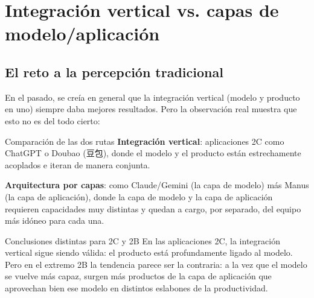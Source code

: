 \section{Integración vertical vs. capas de modelo/aplicación}

\subsection{El reto a la percepción tradicional}

En el pasado, se creía en general que la integración vertical (modelo y producto en uno) siempre daba mejores resultados. Pero la observación real muestra que esto no es del todo cierto:

\begin{knowledgebox}{Comparación de las dos rutas}
\textbf{Integración vertical}: aplicaciones 2C como ChatGPT o Doubao (豆包), donde el modelo y el producto están estrechamente acoplados e iteran de manera conjunta.

\textbf{Arquitectura por capas}: como Claude/Gemini (la capa de modelo) más Manus (la capa de aplicación), donde la capa de modelo y la capa de aplicación requieren capacidades muy distintas y quedan a cargo, por separado, del equipo más idóneo para cada una.
\end{knowledgebox}

\begin{warningbox}{Conclusiones distintas para 2C y 2B}
En las aplicaciones 2C, la integración vertical sigue siendo válida: el producto está profundamente ligado al modelo. Pero en el extremo 2B la tendencia parece ser la contraria: a la vez que el modelo se vuelve más capaz, surgen más productos de la capa de aplicación que aprovechan bien ese modelo en distintos eslabones de la productividad.
\end{warningbox}

